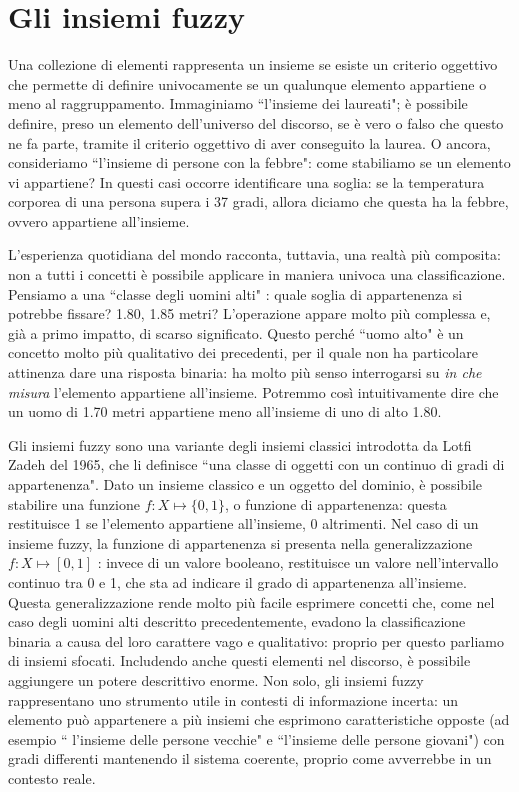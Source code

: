 \documentclass[12pt,a4paper]{report}
\begin{document}
\section{Gli insiemi fuzzy}

Una collezione di elementi rappresenta un insieme se esiste un criterio oggettivo che permette di definire univocamente se un qualunque elemento appartiene o meno al raggruppamento.
Immaginiamo ``l'insieme dei laureati"; è possibile definire, preso un elemento dell'universo del discorso,  se è vero o falso che questo ne fa parte, tramite il criterio oggettivo di aver conseguito la laurea. O ancora, consideriamo  ``l'insieme di persone con la febbre": come stabiliamo se un elemento vi appartiene?
In questi casi occorre identificare una soglia: se la temperatura corporea di una persona supera i 37 gradi, allora diciamo che questa ha la febbre, ovvero appartiene all'insieme.

L'esperienza quotidiana del mondo racconta, tuttavia, una realtà più composita: non a tutti i concetti è possibile applicare in maniera univoca una classificazione.
Pensiamo a una ``classe degli uomini alti" \cite{fuzzysetspaper}: quale soglia di appartenenza si potrebbe fissare? 1.80, 1.85 metri? 
L'operazione appare molto più complessa e, già a primo impatto, di scarso significato. Questo perché ``uomo alto" è un concetto molto più qualitativo dei precedenti, per il quale non ha particolare attinenza dare una risposta binaria: ha molto più senso interrogarsi su \emph{in che misura} l'elemento appartiene all'insieme. Potremmo così intuitivamente dire che un uomo di 1.70 metri appartiene meno all'insieme di uno di alto 1.80.


Gli insiemi fuzzy sono una variante degli insiemi classici introdotta da Lotfi Zadeh del 1965, che li definisce ``una classe di oggetti con un continuo di gradi di appartenenza"\cite{fuzzysetspaper}.
Dato un insieme classico e un oggetto del dominio, è possibile stabilire una funzione  $f: X \mapsto \{0,1\}$, o funzione di appartenenza: questa restituisce 1 se l'elemento appartiene all'insieme, 0 altrimenti.
Nel caso di un insieme fuzzy, la funzione di appartenenza si presenta nella generalizzazione  $f: X \mapsto [0,1]$ : invece di un valore booleano, restituisce un valore nell'intervallo continuo tra 0 e 1, che sta ad indicare il grado di appartenenza all'insieme.
Questa generalizzazione rende molto più facile esprimere concetti che, come nel caso degli uomini alti descritto precedentemente, evadono la classificazione binaria a causa del loro carattere vago e qualitativo: proprio per questo parliamo di insiemi sfocati. Includendo anche questi elementi nel discorso, è possibile aggiungere un potere descrittivo enorme. Non solo, gli insiemi fuzzy rappresentano uno strumento utile in contesti di informazione incerta: un elemento può appartenere a più insiemi che esprimono caratteristiche opposte (ad esempio `` l'insieme delle persone vecchie" e ``l'insieme delle persone giovani"\cite{fuzzysystemspaper}) con gradi differenti mantenendo il sistema coerente, proprio come avverrebbe in un contesto reale.
\end{document}
